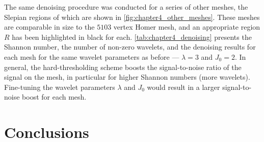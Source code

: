 The same denoising procedure was conducted for a series of other meshes, the Slepian regions of which are shown in \cref{fig:chapter4_other_meshes}.
These meshes are comparable in size to the \(\num{5103}\) vertex Homer mesh, and an appropriate region \(R\) has been highlighted in black for each.
\cref{tab:chapter4_denoising} presents the Shannon number, the number of non-zero wavelets, and the denoising results for each mesh for the same wavelet parameters as before --- \(\lambda=3\) and \(J_{0}=2\).
In general, the hard-thresholding scheme boosts the signal-to-noise ratio of the signal on the mesh, in particular for higher Shannon numbers (more wavelets).
Fine-tuning the wavelet parameters \(\lambda{}\) and \(J_{0}\) would result in a larger signal-to-noise boost for each mesh.







\section{Conclusions}\label{sec:chapter4_conclusions}
